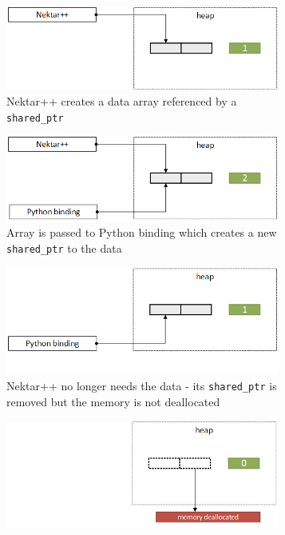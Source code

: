 \begin{figure}[h!]
    \centering
    \begin{subfigure}{0.6\textwidth}
        \includegraphics[width=0.99\textwidth]{img/c_to_python_a}
        \caption{Nektar++ creates a data array referenced by a \texttt{shared\_ptr}}
        \label{fig:c_to_python_a}
    \end{subfigure}
    \begin{subfigure}{0.6\textwidth}
        \includegraphics[width=0.99\textwidth]{img/c_to_python_b}
        \caption{Array is passed to Python binding which creates a new \texttt{shared\_ptr} 
        to the data}
        \label{fig:c_to_python_b}
    \end{subfigure}
    \begin{subfigure}{0.6\textwidth}
        \includegraphics[width=0.99\textwidth]{img/c_to_python_c}
        \caption{Nektar++ no longer needs the data - its \texttt{shared\_ptr} is removed but 
        the memory is not deallocated}
        \label{fig:c_to_python_c}
    \end{subfigure}
    \begin{subfigure}{0.6\textwidth}
        \includegraphics[width=0.99\textwidth]{img/c_to_python_d}

\end{subfigure}
\end{figure}
